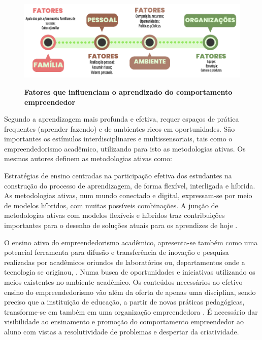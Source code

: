 \begin{figure}[H]
\centering
\caption{\textbf{Fatores que influenciam o aprendizado do comportamento empreendedor}}
\includegraphics[scale=1]{Imagens/esquema_influencias_empreendedorismo.png}
\label{figura_2}
\end{figure}


Segundo  a aprendizagem mais profunda e efetiva, requer espaços de prática frequentes (aprender fazendo) e de ambientes ricos em oportunidades.  São importantes os estímulos interdisciplinares e multissensoriais, tais como o empreendedorismo acadêmico, utilizando para isto as metodologias ativas. Os mesmos autores definem as metodologias ativas como:

\begin{citacao}
Estratégias de ensino centradas na participação efetiva dos estudantes na construção do processo de aprendizagem, de forma flexível, interligada e híbrida. As metodologias ativas, num mundo conectado e digital, expressam-se por meio de modelos híbridos, com muitas possíveis combinações. A junção de metodologias ativas com modelos flexíveis e híbridos traz contribuições importantes para o desenho de soluções atuais para os aprendizes de hoje \cite{bacich_metodologias_2018}.
\end{citacao}

O ensino ativo do empreendedorismo acadêmico, apresenta-se também como uma potencial ferramenta para difusão e transferência de inovação e pesquisa realizadas por acadêmicos oriundos de laboratórios ou, departamentos onde a tecnologia se originou, \cite{guo_what_2019, abreu_nature_2013}. Numa busca de oportunidades e iniciativas utilizando os meios existentes no ambiente acadêmico. Os conteúdos necessários ao efetivo ensino do empreendedorismo vão além da oferta de apenas uma disciplina, sendo preciso que a instituição de educação, a partir de novas práticas pedagógicas, transforme-se em também em uma organização empreendedora \cite{campelli_empreendedorismo_2011}. É necessário dar visibilidade ao ensinamento e promoção do comportamento empreendedor ao aluno com vistas a resolutividade de problemas \cite{degen_o_1989} e despertar da criatividade.

